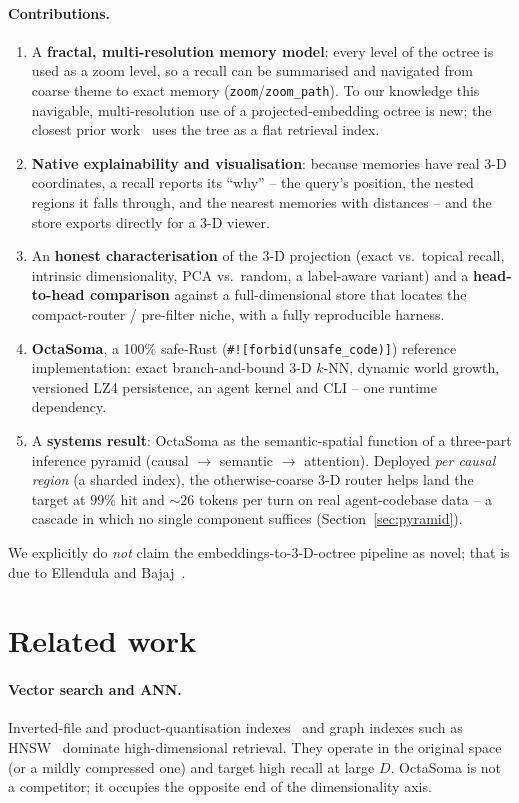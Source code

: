 \documentclass[11pt]{article}
\begin{document}
\paragraph{Contributions.}
\begin{enumerate}
  \item A \textbf{fractal, multi-resolution memory model}: every level of the
  octree is used as a zoom level, so a recall can be summarised and navigated from
  coarse theme to exact memory (\texttt{zoom}/\texttt{zoom\_path}). To our
  knowledge this navigable, multi-resolution use of a projected-embedding octree is
  new; the closest prior work~\cite{octreerag} uses the tree as a flat retrieval
  index.
  \item \textbf{Native explainability and visualisation}: because memories have
  real 3-D coordinates, a recall reports its ``why'' -- the query's position, the
  nested regions it falls through, and the nearest memories with distances -- and
  the store exports directly for a 3-D viewer.
  \item An \textbf{honest characterisation} of the 3-D projection (exact vs.\
  topical recall, intrinsic dimensionality, PCA vs.\ random, a label-aware variant)
  and a \textbf{head-to-head comparison} against a full-dimensional store that
  locates the compact-router / pre-filter niche, with a fully reproducible harness.
  \item \textbf{OctaSoma}, a 100\% safe-Rust (\texttt{\#![forbid(unsafe\_code)]})
  reference implementation: exact branch-and-bound 3-D $k$-NN, dynamic world
  growth, versioned LZ4 persistence, an agent kernel and CLI -- one runtime
  dependency.
  \item A \textbf{systems result}: OctaSoma as the semantic-spatial function of a
  three-part inference pyramid (causal $\rightarrow$ semantic $\rightarrow$
  attention). Deployed \emph{per causal region} (a sharded index), the
  otherwise-coarse 3-D router helps land the target at $99\%$ hit and ${\sim}26$
  tokens per turn on real agent-codebase data -- a cascade in which no single
  component suffices (Section~\ref{sec:pyramid}).
\end{enumerate}
We explicitly do \emph{not} claim the embeddings-to-3-D-octree pipeline as novel;
that is due to Ellendula and Bajaj~\cite{octreerag}.

\section{Related work}
\paragraph{Vector search and ANN.} Inverted-file and product-quantisation
indexes~\cite{ivfpq,faiss} and graph indexes such as HNSW~\cite{hnsw} dominate
high-dimensional retrieval. They operate in the original space (or a mildly
compressed one) and target high recall at large $D$. OctaSoma is not a competitor;
it occupies the opposite end of the dimensionality axis.
\end{document}
